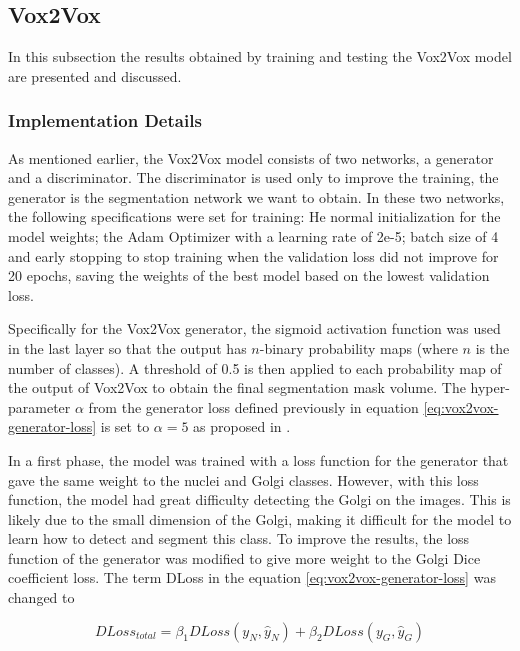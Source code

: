 \subsection{Vox2Vox}

In this subsection the results obtained by training and testing the Vox2Vox model are presented and discussed.

\subsubsection*{Implementation Details}

As mentioned earlier, the Vox2Vox model consists of two networks, a generator and a discriminator. The discriminator is used only to improve the training, the generator is the segmentation network we want to obtain. In these two networks, the following specifications were set for training: He normal initialization for the model weights; the Adam Optimizer with a learning rate of 2e-5; batch size of 4 and early stopping to stop training when the validation loss did not improve for 20 epochs, saving the weights of the best model based on the lowest validation loss.

Specifically for the Vox2Vox generator, the sigmoid activation function was used in the last layer so that the output has $n$-binary probability maps (where $n$ is the number of classes). A threshold of 0.5 is then applied to each probability map of the output of Vox2Vox to obtain the final segmentation mask volume. The hyper-parameter $\alpha$ from the generator loss defined previously in equation \ref{eq:vox2vox-generator-loss} is set to $\alpha = 5$ as proposed in \cite{vox2vox}.

In a first phase, the model was trained with a loss function for the generator that gave the same weight to the nuclei and Golgi classes. However, with this loss function, the model had great difficulty detecting the Golgi on the images. This is likely due to the small dimension of the Golgi, making it difficult for the model to learn how to detect and segment this class. To improve the results, the loss function of the generator was modified to give more weight to the Golgi Dice coefficient loss. The term \ac{DLoss} in the equation \ref{eq:vox2vox-generator-loss} was changed to

\begin{equation}
    DLoss_{total} = \beta_1 DLoss(y_N,\hat{y}_N) + \beta_2 DLoss(y_G,\hat{y}_G)
\end{equation}

